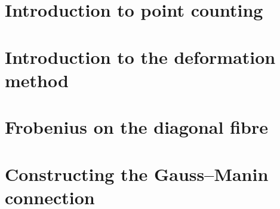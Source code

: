 
\chapter{Introduction to point counting}
\label{ch:01-Intro}




\chapter{Introduction to the deformation method}
\label{ch:01-DMIntro}




\chapter{Frobenius on the diagonal fibre}
\label{ch:01-DiagFrob}




\chapter{Constructing the Gauss--Manin connection}
\label{ch:GMConnection}




